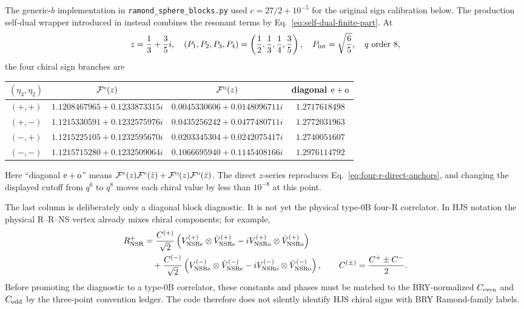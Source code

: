 \documentclass[11pt]{article}
\newcommand{\NS}{\mathrm{NS}}
\newcommand{\R}{\mathrm{R}}
\newcommand{\F}{\mathcal F}
\begin{document}
The generic-$b$ implementation in \texttt{ramond\_sphere\_blocks.py} used
$c=27/2+10^{-5}$ for the original sign calibration below.  The production
self-dual wrapper introduced in
 instead combines the
resonant terms by Eq.~\eqref{eq:self-dual-finite-part}.  At
\begin{equation}
 z=\frac13+\frac35i,\quad
 (P_1,P_2,P_3,P_4)=\left(\frac12,\frac13,\frac14,\frac35\right),\quad
 P_{\rm int}=\sqrt{\frac65},\quad \text{$q$ order }8,
 \label{eq:four-r-numerical-point}
\end{equation}
the four chiral sign branches are
\begin{center}
\begin{tabular}{@{}cccc@{}}
\toprule
$(\eta_3,\eta_2)$ & $\F^{\rm e}(z)$ & $\F^{\rm o}(z)$
& diagonal ${\rm e}+{\rm o}$\\
\midrule
$(+,+)$ & $1.1208467965+0.1233873315i$
        & $0.0045330606+0.0148096711i$ & $1.2717618498$\\
$(+,-)$ & $1.1215330591+0.1232575976i$
        & $0.0435256242+0.0477480711i$ & $1.2772031963$\\
$(-,+)$ & $1.1215225105+0.1232595670i$
        & $0.0203345304+0.0242075417i$ & $1.2740051607$\\
$(-,-)$ & $1.1215715280+0.1232509064i$
        & $0.1066695940+0.1145408166i$ & $1.2976114792$\\
\bottomrule
\end{tabular}
\end{center}
Here ``diagonal ${\rm e}+{\rm o}$'' means
$\F^{\rm e}(z)\F^{\rm e}(\bar z)
+\F^{\rm o}(z)\F^{\rm o}(\bar z)$.  The direct $z$-series reproduces
Eq.~\eqref{eq:four-r-direct-anchors}, and changing the displayed cutoff from
$q^6$ to $q^8$ moves each chiral value by less than $10^{-8}$ at this point.

The last column is deliberately only a diagonal block diagnostic.  It is
not yet the physical type-0B four-R correlator.  In HJS notation the physical
R--R--NS vertex already mixes chiral components; for example,
\begin{equation}
\begin{aligned}
 R_{\NS\R}^{+}
 &=\frac{C^{(+)}}{\sqrt2}
 \left(V_{\NS\R{\rm e}}^{(+)}\otimes
       \bar V_{\NS\R{\rm e}}^{(+)}
 -iV_{\NS\R{\rm o}}^{(+)}\otimes
       \bar V_{\NS\R{\rm o}}^{(+)}\right)
 \\
 &\quad+\frac{C^{(-)}}{\sqrt2}
 \left(V_{\NS\R{\rm e}}^{(-)}\otimes
       \bar V_{\NS\R{\rm e}}^{(-)}
 -iV_{\NS\R{\rm o}}^{(-)}\otimes
       \bar V_{\NS\R{\rm o}}^{(-)}\right),
 \qquad C^{(\pm)}=\frac{C^+\pm C^-}{2}.
\end{aligned}
\label{eq:hjs-nonchiral-vertex-example}
\end{equation}
Before promoting the diagnostic to a type-0B correlator, these constants and
phases must be matched to the BRY-normalized $C_{\rm even}$ and
$C_{\rm odd}$ by the three-point convention ledger.  The code therefore
does not silently identify HJS chiral signs with BRY Ramond-family labels.
\end{document}
